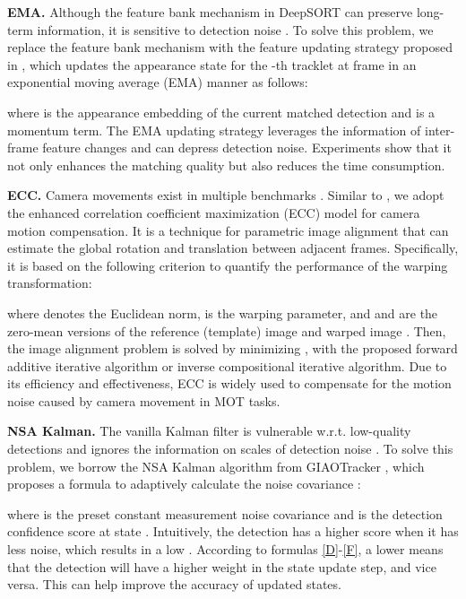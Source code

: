 \documentclass[lettersize,journal]{IEEEtran}
\begin{document}
\noindent \textbf{EMA.}
Although the feature bank mechanism in DeepSORT can preserve long-term information, it is sensitive to detection noise \cite{du2021giaotracker}.
To solve this problem, we replace the feature bank mechanism with the feature updating strategy proposed in \cite{wang2020towards}, 
which updates the appearance state  for the -th tracklet at frame  in an exponential moving average (EMA) manner as follows:

where  is the appearance embedding of the current matched detection and  is a momentum term.
The EMA updating strategy leverages the information of inter-frame feature changes and can depress detection noise.
Experiments show that it not only enhances the matching quality but also reduces the time consumption.

\noindent \textbf{ECC.}
Camera movements exist in multiple benchmarks \cite{milan2016mot16, sun2022dancetrack, geiger2013vision}.
Similar to \cite{han2022mat, stadler2022modelling, khurana2021detecting, he2021learnable}, 
we adopt the enhanced correlation coefficient maximization (ECC) \cite{evangelidis2008parametric} model for camera motion compensation.
It is a technique for parametric image alignment that can estimate the global rotation and translation between adjacent frames.
Specifically, it is based on the following criterion to quantify the performance of the warping transformation:

where  denotes the Euclidean norm,  is the warping parameter, 
and  and  are the zero-mean versions of 
the reference (template) image  and warped image .
Then, the image alignment problem is solved by minimizing , with the proposed 
forward additive iterative algorithm or inverse compositional iterative algorithm.
Due to its efficiency and effectiveness, ECC is widely used to compensate for the motion noise caused by camera movement in MOT tasks.

\noindent \textbf{NSA Kalman.}
The vanilla Kalman filter is vulnerable w.r.t. low-quality detections \cite{stadler2022modelling} 
and ignores the information on scales of detection noise \cite{du2021giaotracker}.
To solve this problem, we borrow the NSA Kalman algorithm from GIAOTracker \cite{du2021giaotracker},
which proposes a formula to adaptively calculate the noise covariance :

where  is the preset constant measurement noise covariance and  is the detection confidence score at state .
Intuitively, the detection has a higher score  when it has less noise, which results in a low .
According to formulas \ref{D}-\ref{F}, a lower  means that the detection will have a higher weight in the state update step, and vice versa.
This can help improve the accuracy of updated states.
\end{document}
